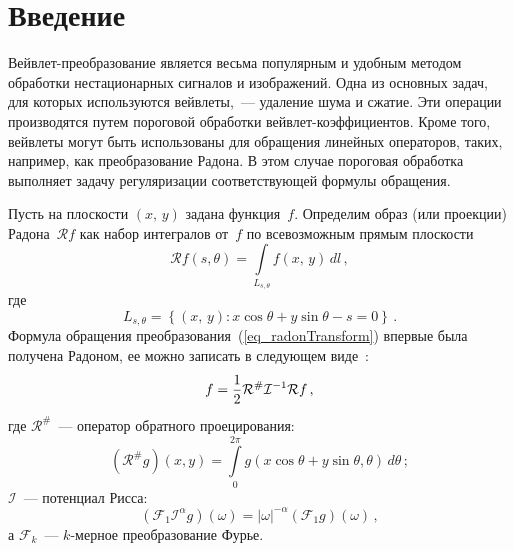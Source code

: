 

      \thispagestyle{headings}

      \begin{multicols}{2}

      \label{st\stat}


\section{Введение}

Вейвлет-преобразование является весьма популярным и удобным методом обработки нестационарных сигналов и 
изображений. Одна из основных задач, для которых используются вейв\-ле\-ты,~---
удаление шума и сжатие. Эти операции производятся путем пороговой обработки 
вейв\-лет-коэффициентов. Кроме того, вейвлеты могут быть использованы для обращения 
линейных операторов, таких, например, как преобразование Радона. В этом случае 
пороговая обработка выполняет задачу регуляризации соответствующей формулы обращения.

Пусть на плоскости $(x,\,y)$ задана функция~$f$. Определим образ 
(или проекции) Радона~$\mathcal{R}f$ как набор интегралов от~$f$ по всевозможным прямым плоскости
\begin{equation}
\label{eq_radonTransform}
\mathcal{R}f(s,\theta)=\int\limits_{L_{s,\theta}}f\left(x,\,y\right)\,dl\,,
\end{equation}
где
\begin{equation*}
L_{s,\theta}=\left\{ (x,\,y): x\cos\theta+y\sin\theta-s=0 \right \}\,.
\end{equation*}
Формула обращения преобразования~(\ref{eq_radonTransform}) впервые была получена 
Радоном, ее можно записать в следующем виде~\cite{Natterer}:
\begin{equation}
\label{eq_radonInverse}
f = \displaystyle\frac{\displaystyle 1\mathstrut}{\displaystyle 2\mathstrut}\mathcal{R}^{\#}\mathcal{I}^{-1}\mathcal{R}f\,,
\end{equation}
где $\mathcal{R^{\#}}$~--- оператор обратного проецирования:
\begin{equation*}
\left(\mathcal{R^{\#}}g\right)(x,y)=\int\limits_0^{2\pi}g(x\cos\theta+y\sin\theta,\theta)\,d\theta\,;
\end{equation*}
$\mathcal{I}$~--- потенциал Рисса:
\begin{equation}
\label{eq_RieszPoten}
\left(\mathcal{F}_1\mathcal{I}^\alpha g\right) (\omega) = |\omega|^{-\alpha}\left(\mathcal{F}_1 g\right)(\omega)\,,
\end{equation}
а $\mathcal{F}_k$~--- $k$-мерное преобразование Фурье.


\end{multicols}
